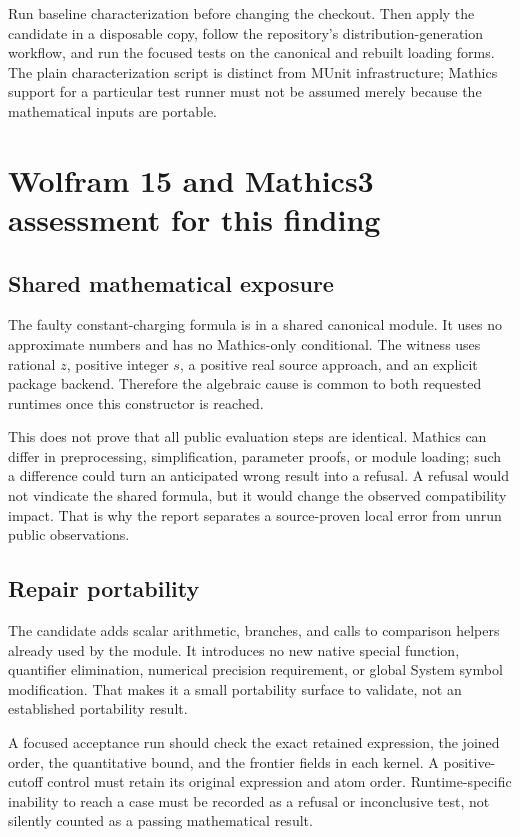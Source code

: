 \documentclass[11pt,letterpaper]{article}
\begin{document}
Run baseline characterization before changing the checkout. Then apply the
candidate in a disposable copy, follow the repository's distribution-generation
workflow, and run the focused tests on the canonical and rebuilt loading forms.
The plain characterization script is distinct from MUnit infrastructure;
Mathics support for a particular test runner must not be assumed merely because
the mathematical inputs are portable.

\section{Wolfram 15 and Mathics3 assessment for this finding}
\subsection{Shared mathematical exposure}
The faulty constant-charging formula is in a shared canonical module. It uses
no approximate numbers and has no Mathics-only conditional. The witness uses
rational $z$, positive integer $s$, a positive real source approach, and an
explicit package backend. Therefore the algebraic cause is common to both
requested runtimes once this constructor is reached.\cite{dirichlet}

This does not prove that all public evaluation steps are identical. Mathics
can differ in preprocessing, simplification, parameter proofs, or module
loading; such a difference could turn an anticipated wrong result into a
refusal. A refusal would not vindicate the shared formula, but it would change
the observed compatibility impact. That is why the report separates a
source-proven local error from unrun public observations.

\subsection{Repair portability}
The candidate adds scalar arithmetic, branches, and calls to comparison helpers
already used by the module. It introduces no new native special function,
quantifier elimination, numerical precision requirement, or global System
symbol modification. That makes it a small portability surface to validate,
not an established portability result.

A focused acceptance run should check the exact retained expression, the joined
order, the quantitative bound, and the frontier fields in each kernel. A
positive-cutoff control must retain its original expression and atom order.
Runtime-specific inability to reach a case must be recorded as a refusal or
inconclusive test, not silently counted as a passing mathematical result.
\end{document}
